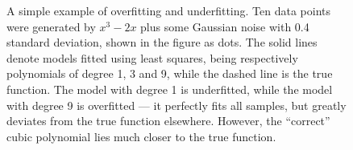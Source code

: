 \begin{figure}
    \caption{
        A simple example of overfitting and underfitting.
        Ten data points were generated by $x^3-2x$ plus some Gaussian noise with 0.4 standard deviation, shown in the figure as dots.
        The solid lines denote models fitted using least squares, being respectively polynomials of degree 1, 3 and 9, while the dashed line is the true function.
        The model with degree 1 is underfitted, while the model with degree 9 is overfitted — it perfectly fits all samples, but greatly deviates from the true function elsewhere.
        However, the \enquote{correct} cubic polynomial lies much closer to the true function.}
    \label{fig:over_under_fit}
\end{figure}